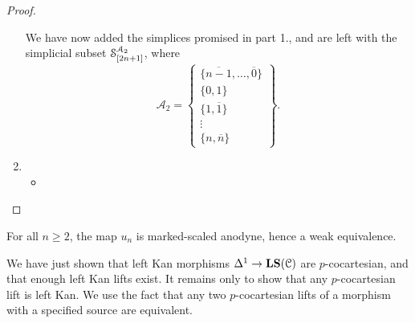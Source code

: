 \documentclass[main.tex]{subfiles}
\begin{document}
\begin{proof}
\begin{enumerate}
      We have now added the simplices promised in part 1., and are left with the simplicial subset $\S^{\mathcal{A}_{2}}_{[2n+1]}$, where
      \begin{equation*}
        \mathcal{A}_{2}
        = \left\{ \substack{ \{\overline{n-1}, \ldots, \overline{0}\} \\ \{0, 1\} \\ \{1, \overline{1}\} \\ \vdots \\ \{n, \overline{n}\} } \right\}.
      \end{equation*}

    \item 
      \begin{itemize}
        \item 
      \end{itemize}
  \end{enumerate}
\end{proof}

\begin{lemma}
  \label{lemma:upper_morphism_equivalence}
  For all $n \geq 2$, the map $u_{n}$ is marked-scaled anodyne, hence a weak equivalence.
\end{lemma}


We have just shown that left Kan morphisms $\Delta^{1} \to \LS(\category{C})$ are $p$-cocartesian, and that enough left Kan lifts exist. It remains only to show that any $p$-cocartesian lift is left Kan. We use the fact that any two $p$-cocartesian lifts of a morphism with a specified source are equivalent.
\end{document}
